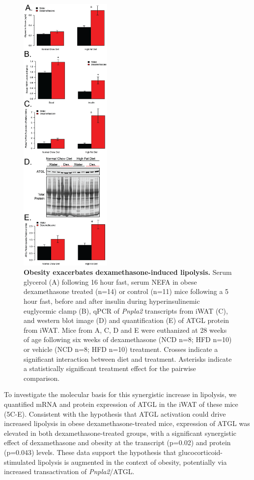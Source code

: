 \documentclass[11pt]{article} %
\begin{document}
\begin{figure}
  \begin{center}
    \includegraphics[width=0.4\textwidth]{Figures_Figure_5.png}
  \end{center}
  \caption{\textbf{Obesity exacerbates dexamethasone-induced lipolysis. }
Serum glycerol (A) following 16 hour fast, serum NEFA in obese
dexamethasone treated (n=14) or control (n=11) mice following a 5 hour
fast, before and after insulin during hyperinsulinemic euglycemic clamp
(B), qPCR of \emph{Pnpla2} transcripts from iWAT (C), and western blot
image (D) and quantification (E) of ATGL protein from iWAT. Mice from A,
C, D and E were euthanized at 28 weeks of age following six weeks of
dexamethasone (NCD n=8; HFD n=10) or vehicle (NCD n=8; HFD n=10)
treatment. Crosses indicate a significant interaction between diet and
treatment. Asterisks indicate a statistically significant treatment
effect for the pairwise comparison.}
 \label{fig:5}
\end{figure}

To investigate the molecular basis for this synergistic increase in
lipolysis, we quantified mRNA and protein expression of ATGL in the iWAT
of these mice (5C-E). Consistent with the hypothesis that ATGL
activation could drive increased lipolysis in obese
dexamethasone-treated mice, expression of ATGL was elevated in both
dexamethasone-treated groups, with a significant synergistic effect of
dexamethasone and obesity at the transcript (p=0.02) and protein
(p=0.043) levels. These data support the hypothesis that
glucocorticoid-stimulated lipolysis is augmented in the context of
obesity, potentially via increased transactivation of
\emph{Pnpla2}/ATGL.
\end{document}
